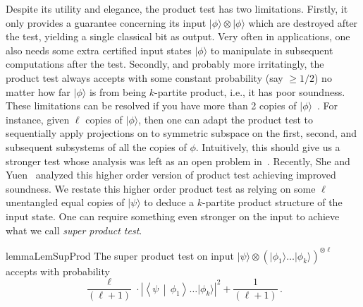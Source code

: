 \documentclass[10pt,a4paper]{article}
\theoremstyle{remark}
\newcommand{\mper}{\,.}
\newcommand{\abs}[1]{\ensuremath{\left\lvert #1 \right\rvert}}
\newcommand{\1}[1]{\mathds{1}{[#1]}}
\newcommand{\ket}[1]{\lvert #1\rangle}
\newcommand{\braket}[2]{\left\langle #1 \,\middle\vert\, #2\right\rangle}
\numberwithin{equation}{section}
\begin{document}
Despite its utility and elegance, the product test has two limitations.
%
Firstly, it only provides a guarantee concerning its input $\ket{\phi}\otimes \ket{\phi}$ which 
are destroyed after the test, yielding a single classical bit as output.
%
Very often in applications, one also needs some extra certified input states $\ket\phi$ to manipulate in subsequent computations after
the test.
%
Secondly, and  probably more irritatingly, the product test always accepts with some 
constant probability (say $\ge 1/2$) no matter how far $\ket{\phi}$ is from
being $k$-partite product, i.e., it has poor soundness.
%
These limitations can be resolved if you have more than 2 copies of $\ket\phi$~\cite{Kada_2008, SY23}.
%
For instance, given $\ell$ copies of $\ket\phi$, then one can adapt the product test to
sequentially apply projections on to symmetric subspace on the first, second, and subsequent
subsystems of all the copies of $\phi$.
%
Intuitively, this should give us a stronger test whose analysis was left as an open problem in~\cite{HM13}.
%
Recently, She and Yuen~\cite{SY23} analyzed this higher order version of product test achieving improved soundness.
%
We restate this higher order product test as relying on some $\ell$ unentangled equal copies of 
$\ket{\psi}$ to deduce a $k$-partite product structure of the input state.
%
One can require something even stronger on the input to achieve what we call \emph{super product test}.

\begin{restatable}{lemma}{LemSupProd}\label{lem:super_product}
  The super product test on input $\ket{\psi} \otimes (\ket{\phi_1}\ldots\ket{\phi_k})^{\otimes \ell}$ accepts with probability
  \[
  \frac{\ell}{(\ell+1)} \cdot \abs{\braket{\psi}{\phi_1}\ldots\ket{\phi_k}}^2 + \frac{1}{(\ell+1)}\mper
  \]
\end{restatable}
\end{document}
